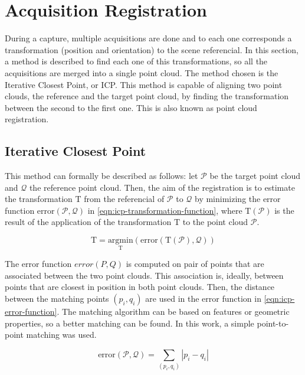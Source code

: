\section{Acquisition Registration}
\label{section:acquisition-registration}

During a capture, multiple acquisitions are done and to each one corresponds a transformation (position and orientation) to the scene referencial. In this section, a method is described to find each one of this transformations, so all the acquisitions are merged into a single point cloud. The method chosen is the Iterative Closest Point, or ICP. This method is capable of aligning two point clouds, the reference and the target point cloud, by finding the transformation between the second to the first one. This is also known as point cloud registration.

\subsection{Iterative Closest Point}

\newcommand{\T}{\mathrm{T}}
\newcommand{\Pt}{\mathcal{P}}
\newcommand{\Q}{\mathcal{Q}}

This method can formally be described as follows: let $\Pt$ be the target point cloud and $\Q$ the reference point cloud. Then, the aim of the registration is to estimate the transformation $\T$ from the referencial of $\Pt$ to $\Q$ by minimizing the error function $\textrm{error}(\Pt, \Q)$ in \cref{eqn:icp-transformation-function}, where $\T(\Pt)$ is the result of the application of the transformation $\T$ to the point cloud $\Pt$.

\begin{equation}
\label{eqn:icp-transformation-function}
    \T = \underset{\T}{\textrm{argmin}}\left(\mathrm{error}(\T(\Pt), \Q)\right)
\end{equation}

The error function $error(P, Q)$ is computed on pair of points that are associated between the two point clouds. This association is, ideally, between points that are closest in position in both point clouds. Then, the distance between the matching points $(p_i, q_i)$ are used in the error function in \cref{eqn:icp-error-function}. The matching algorithm can be based on features or geometric properties, so a better matching can be found. In this work, a simple point-to-point matching was used. 

\begin{equation}
\label{eqn:icp-error-function}
    \textrm{error}(\Pt, \Q) = \sum_{(p_i, q_i)}{|p_i - q_i|}
\end{equation}

